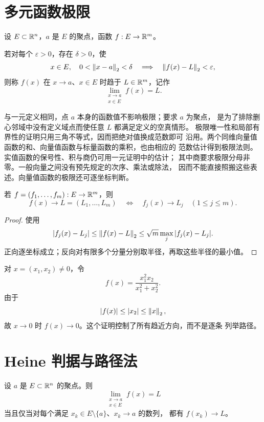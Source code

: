 \section{多元函数极限}

设 \(E\subset\mathbb{R}^n\)，\(a\) 是 \(E\) 的聚点，函数
\(f:E\to\mathbb{R}^m\)。

\begin{definition}[多元函数极限]
若对每个 \(\varepsilon>0\)，存在 \(\delta>0\)，使
\[
 x\in E,\quad0<\left\lVert x-a\right\rVert_2<\delta
 \quad\Longrightarrow\quad
 \left\lVert f(x)-L\right\rVert_2<\varepsilon,
\]
则称 \(f(x)\) 在 \(x\to a\)、\(x\in E\) 时趋于 \(L\in\mathbb{R}^m\)，记作
\[
 \lim_{\substack{x\to a\\x\in E}}f(x)=L.
\]
\end{definition}

与一元定义相同，点 \(a\) 本身的函数值不影响极限；要求 \(a\) 为聚点，
是为了排除删心邻域中没有定义域点而使任意 \(L\) 都满足定义的空真情形。
极限唯一性和局部有界性的证明只用三角不等式，因而把绝对值换成范数即可
沿用。两个同维向量值函数的和、向量值函数与标量函数的乘积，也由相应的
范数估计得到极限法则。实值函数的保号性、积与商仍可用一元证明中的估计；
其中商要求极限分母非零。一般向量之间没有预先规定的次序、乘法或除法，
因而不能直接照搬这些表述。向量值函数的极限还可逐坐标判断。

\begin{proposition}[分量判据]
若 \(f=(f_1,\ldots,f_m):E\to\mathbb{R}^m\)，则
\[
 f(x)\to L=(L_1,\ldots,L_m)
 \quad\Longleftrightarrow\quad
 f_j(x)\to L_j\quad(1\le j\le m).
\]
\end{proposition}

\begin{proof}
使用
\[
 |f_j(x)-L_j|\le\left\lVert f(x)-L\right\rVert_2
 \le\sqrt m\max_j|f_j(x)-L_j|.
\]
正向逐坐标成立；反向对有限多个分量分别取半径，再取这些半径的最小值。
\end{proof}

\begin{example}
对 \(x=(x_1,x_2)\ne0\)，令
\[
 f(x)=\frac{x_1^2x_2}{x_1^2+x_2^2}.
\]
由于
\[
 |f(x)|\le |x_2|\le\left\lVert x\right\rVert_2,
\]
故 \(x\to0\) 时 \(f(x)\to0\)。这个证明控制了所有趋近方向，而不是逐条
列举路径。
\end{example}

\section{Heine 判据与路径法}

\begin{theorem}[多元 Heine 判据]
\label{thm:multivariable-heine}
设 \(a\) 是 \(E\subset\mathbb{R}^n\) 的聚点。则
\[
 \lim_{\substack{x\to a\\x\in E}}f(x)=L
\]
当且仅当对每个满足 \(x_k\in E\setminus\{a\}\)、\(x_k\to a\) 的数列，
都有 \(f(x_k)\to L\)。
\end{theorem}

